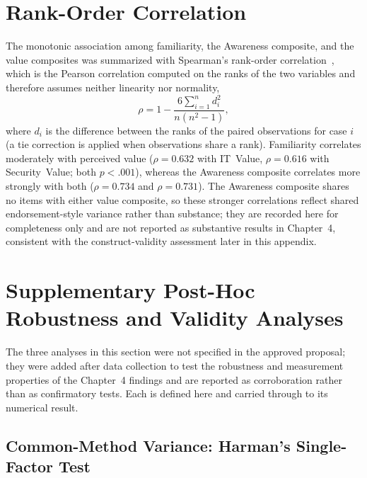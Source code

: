 \section{Rank-Order Correlation}

The monotonic association among familiarity, the Awareness composite, and the value composites was summarized with Spearman's rank-order correlation~\parencite{Spearman_1904}, which is the Pearson correlation computed on the ranks of the two variables and therefore assumes neither linearity nor normality,
\begin{equation}
  \rho = 1 - \frac{6\sum_{i=1}^{n} d_i^2}{n\left(n^2-1\right)},
\end{equation}
where $d_i$ is the difference between the ranks of the paired observations for case $i$ (a tie correction is applied when observations share a rank). Familiarity correlates moderately with perceived value ($\rho = 0.632$ with IT~Value, $\rho = 0.616$ with Security~Value; both $p<.001$), whereas the Awareness composite correlates more strongly with both ($\rho = 0.734$ and $\rho = 0.731$). The Awareness composite shares no items with either value composite, so these stronger correlations reflect shared endorsement-style variance rather than substance; they are recorded here for completeness only and are not reported as substantive results in Chapter~4, consistent with the construct-validity assessment later in this appendix.

\section{Supplementary Post-Hoc Robustness and Validity Analyses}\label{sec:appb-posthoc}

The three analyses in this section were not specified in the approved proposal; they were added after data collection to test the robustness and measurement properties of the Chapter~4 findings and are reported as corroboration rather than as confirmatory tests. Each is defined here and carried through to its numerical result.

\subsection{Common-Method Variance: Harman's Single-Factor Test}

